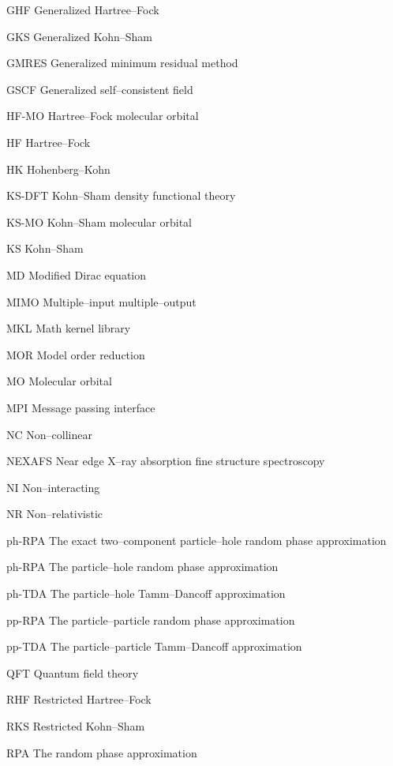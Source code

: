\begin{glossary}
  \item[GHF]         Generalized Hartree--Fock
  \item[GKS]         Generalized Kohn--Sham
  \item[GMRES]       Generalized minimum residual method
  \item[GSCF]        Generalized self--consistent field
  \item[HF-MO]       Hartree--Fock   molecular orbital
  \item[HF]          Hartree--Fock
  \item[HK]          Hohenberg--Kohn
  \item[KS-DFT]      Kohn--Sham density functional theory
  \item[KS-MO]       Kohn--Sham   molecular orbital
  \item[KS]          Kohn--Sham
  \item[MD]          Modified Dirac equation
  \item[MIMO]        Multiple--input multiple--output
  \item[MKL]         Math kernel library
  \item[MOR]         Model order reduction
  \item[MO]          Molecular orbital
  \item[MPI]         Message passing interface
  \item[NC]          Non--collinear
  \item[NEXAFS]      Near edge X--ray absorption fine structure spectroscopy
  \item[NI]          Non--interacting
  \item[NR]          Non--relativistic
  \item[ph-RPA]      The exact two--component particle--hole random phase approximation
  \item[ph-RPA]      The particle--hole random phase approximation
  \item[ph-TDA]      The particle--hole Tamm--Dancoff approximation
  \item[pp-RPA]      The particle--particle random phase approximation
  \item[pp-TDA]      The particle--particle Tamm--Dancoff approximation
  \item[QFT]         Quantum field theory
  \item[RHF]         Restricted Hartree--Fock
  \item[RKS]         Restricted Kohn--Sham
  \item[RPA]         The random phase approximation

\end{glossary}
